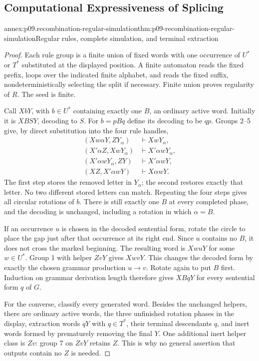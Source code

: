 \subsection{Computational Expressiveness of Splicing}
\label{annex:p09-recombination-computation}

\begin{annexitem}{annex:p09.recombination-regular-simulation}{thm:p09-recombination-regular-simulation}{Regular rules, complete simulation, and terminal extraction}
\begin{proof}
Each rule group is a finite union of fixed words with one occurrence of
\(U^*\) or \(T^*\) substituted at the displayed position. A finite
automaton reads the fixed prefix, loops over the indicated finite alphabet,
and reads the fixed suffix, nondeterministically selecting the split if
necessary. Finite union proves regularity of \(R\). The seed is finite.

Call \(XbY\), with \(b\in U^*\) containing exactly one \(B\), an ordinary
active word. Initially it is \(XBSY\), decoding to \(S\).
For \(b=pBq\) define its decoding to be \(qp\).
Groups 2--5 give, by direct substitution into the four rule handles,
\[
\begin{aligned}
 (Xw\alpha Y,ZY_\alpha)&\vdash XwY_\alpha,\\
 (X'\alpha Z,XwY_\alpha)&\vdash X'\alpha wY_\alpha,\\
 (X'\alpha wY_\alpha,ZY)&\vdash X'\alpha wY,\\
 (XZ,X'\alpha wY)&\vdash X\alpha wY.
\end{aligned}
\]
The first step stores the removed letter in \(Y_\alpha\); the second
restores exactly that letter. No two different stored letters can match.
Repeating the four steps gives all circular rotations of \(b\).
There is still exactly one \(B\) at every completed phase, and the
decoding is unchanged, including a rotation in which \(\alpha=B\).

If an occurrence \(u\) is chosen in the decoded sentential form, rotate
the circle to place the gap just after that occurrence at its right end.
Since \(u\) contains no \(B\), it does not cross the marked beginning.
The resulting word is \(XwuY\) for some \(w\in U^*\).
Group 1 with helper \(ZvY\) gives \(XwvY\). This changes the decoded
form by exactly the chosen grammar production \(u\to v\).
Rotate again to put \(B\) first. Induction on grammar derivation length
therefore gives \(XBqY\) for every sentential form \(q\) of \(G\).

For the converse, classify every generated word. Besides the unchanged
helpers, there are ordinary active words, the three unfinished rotation
phases in the display, extraction words \(qY\) with \(q\in T^*\), their
terminal descendants \(q\), and inert words formed by prematurely
removing the final \(Y\). One additional inert helper class is \(Zv\):
group 7 on \(ZvY\) retains \(Z\). This is why no general assertion
that outputs contain no \(Z\) is needed.


\end{proof}
\end{annexitem}

